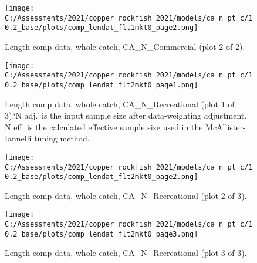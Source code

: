 \documentclass[11pt,
  english,
  a4paper,
]{article}
\begin{document}
\tagmcend\tagstructend


\begin{figure}
\centering
\texttt{[image: C:/Assessments/2021/copper\_rockfish\_2021/models/ca\_n\_pt\_c/10.2\_base/plots/comp\_lendat\_flt1mkt0\_page2.png]}
\caption{Length comp data, whole catch, CA\_N\_Commercial (plot 2 of 2).\label{fig:comp_lendat_flt1mkt0_page2}}
\end{figure}

\tagmcend\tagstructend


\begin{figure}
\centering
\texttt{[image: C:/Assessments/2021/copper\_rockfish\_2021/models/ca\_n\_pt\_c/10.2\_base/plots/comp\_lendat\_flt2mkt0\_page1.png]}
\caption{Length comp data, whole catch, CA\_N\_Recreational (plot 1 of 3).`N adj.' is the input sample size after data-weighting adjustment. N eff. is the calculated effective sample size used in the McAllister-Iannelli tuning method.\label{fig:comp_lendat_flt2mkt0_page1}}
\end{figure}

\tagmcend\tagstructend


\begin{figure}
\centering
\texttt{[image: C:/Assessments/2021/copper\_rockfish\_2021/models/ca\_n\_pt\_c/10.2\_base/plots/comp\_lendat\_flt2mkt0\_page2.png]}
\caption{Length comp data, whole catch, CA\_N\_Recreational (plot 2 of 3).\label{fig:comp_lendat_flt2mkt0_page2}}
\end{figure}

\tagmcend\tagstructend


\begin{figure}
\centering
\texttt{[image: C:/Assessments/2021/copper\_rockfish\_2021/models/ca\_n\_pt\_c/10.2\_base/plots/comp\_lendat\_flt2mkt0\_page3.png]}
\caption{Length comp data, whole catch, CA\_N\_Recreational (plot 3 of 3).\label{fig:comp_lendat_flt2mkt0_page3}}
\end{figure}
\end{document}
